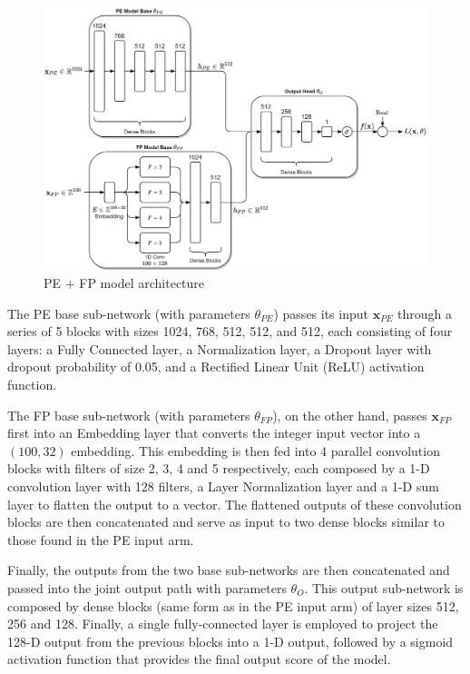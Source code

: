 \documentclass[pdfa%
,cucitura%
]{toptesi}
\begin{document}
\begin{figure}[h]
	\centering
	\includegraphics[width=\textwidth]{./images/PE_plus_FP.png}
	\caption[PE + FP model architecture]{PE + FP model architecture}
	\label{fig:PE_plus_FP_model}
\end{figure}

The PE base sub-network (with parameters $\theta_{PE}$) passes its input $\textbf{x}_{PE}$ through a series of 5 blocks with sizes 1024, 768, 512, 512, and 512, each consisting of four layers: a Fully Connected layer, a Normalization layer, a Dropout layer with dropout probability of 0.05, and a Rectified Linear Unit (ReLU) activation function.

The FP base sub-network (with parameters $\theta_{FP}$), on the other hand, passes $\textbf{x}_{FP}$ first into an Embedding layer that converts the integer input vector into a $(100, 32)$ embedding. This embedding is then fed into 4 parallel convolution blocks with filters of size 2, 3, 4 and 5 respectively, each composed by a 1-D convolution layer with 128 filters, a Layer Normalization layer and a 1-D sum layer to flatten the output to a vector. The flattened outputs of these convolution blocks are then concatenated and serve as input to two dense blocks similar to those found in the PE input arm.

Finally, the outputs from the two base sub-networks are then concatenated and passed into the joint output path with parameters $\theta_{O}$. This output sub-network is composed by dense blocks (same form as in the PE input arm) of layer sizes 512, 256 and 128. Finally, a single fully-connected layer is employed to project the 128-D output from the previous blocks into a 1-D output, followed by a sigmoid activation function that provides the final output score of the model.
\end{document}
